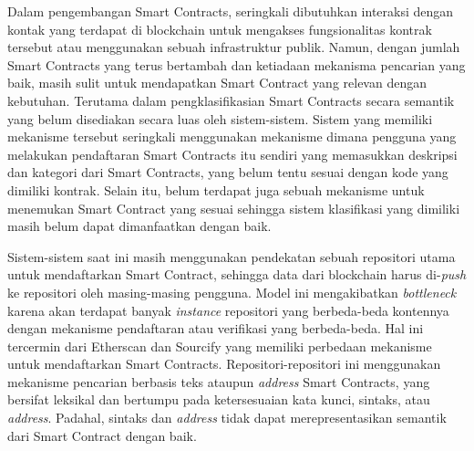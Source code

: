 Dalam pengembangan Smart Contracts, seringkali dibutuhkan interaksi dengan kontak yang terdapat di blockchain untuk mengakses fungsionalitas kontrak tersebut atau menggunakan sebuah infrastruktur publik. Namun, dengan jumlah Smart Contracts yang terus bertambah dan ketiadaan mekanisma pencarian yang baik, masih sulit untuk mendapatkan Smart Contract yang relevan dengan kebutuhan. Terutama dalam pengklasifikasian Smart Contracts secara semantik yang belum disediakan secara luas oleh sistem-sistem. Sistem yang memiliki mekanisme tersebut seringkali menggunakan mekanisme dimana pengguna yang melakukan pendaftaran Smart Contracts itu sendiri yang memasukkan deskripsi dan kategori dari Smart Contracts, yang belum tentu sesuai dengan kode yang dimiliki kontrak. Selain itu, belum terdapat juga sebuah mekanisme untuk menemukan Smart Contract yang sesuai sehingga sistem klasifikasi yang dimiliki masih belum dapat dimanfaatkan dengan baik.

Sistem-sistem saat ini masih menggunakan pendekatan sebuah repositori utama untuk mendaftarkan Smart Contract, sehingga data dari blockchain harus di-\textit{push} ke repositori oleh masing-masing pengguna. Model ini mengakibatkan \textit{bottleneck} karena akan terdapat banyak \textit{instance} repositori yang berbeda-beda kontennya dengan mekanisme pendaftaran atau verifikasi yang berbeda-beda. Hal ini tercermin dari Etherscan dan Sourcify yang memiliki perbedaan mekanisme untuk mendaftarkan Smart Contracts. Repositori-repositori ini menggunakan mekanisme pencarian berbasis teks ataupun \textit{address} Smart Contracts, yang bersifat leksikal dan bertumpu pada ketersesuaian kata kunci, sintaks, atau \textit{address}. Padahal, sintaks dan \textit{address} tidak dapat merepresentasikan semantik dari Smart Contract dengan baik.

